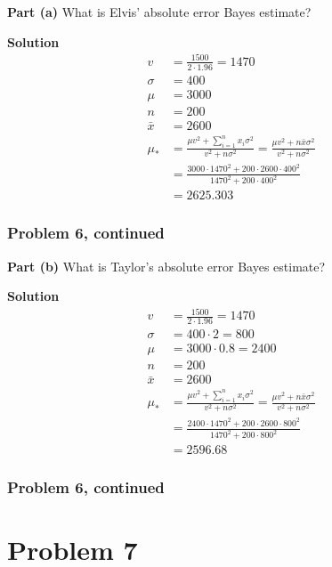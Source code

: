 \documentclass[12pt]{article}
\theoremstyle{definition}
\begin{document}
\bigskip
\noindent
{\bf Part (a)} What is Elvis' absolute error Bayes estimate?


\bigskip
\noindent
{\bf Solution}
\begin{align*}
v &=  \frac{1500}{2\cdot 1.96} = 1470\\
\sigma &= 400\\
\mu &= 3000\\
n &= 200\\
\bar{x} &= 2600\\
\mu_{*} &= \frac{\mu v^2 + \sum_{i=1}^n x_i \sigma^2}{v^2 + n\sigma^2} = \frac{\mu v^2 + n \bar{x}\sigma^2}{v^2 + n\sigma^2}\\
&= \frac{3000 \cdot 1470^2 + 200 \cdot 2600 \cdot 400^2}{1470^2 + 200 \cdot 400^2}\\
&= 2625.303
\end{align*}

\newpage
\subsubsection*{Problem 6, continued}

\vspace{3.5in}
\noindent
{\bf Part (b)} What is Taylor's absolute error Bayes estimate?

\bigskip
\noindent
{\bf Solution}
\begin{align*}
v &=  \frac{1500}{2\cdot 1.96} = 1470\\
\sigma &= 400 \cdot 2 = 800\\
\mu &= 3000 \cdot 0.8 = 2400\\
n &= 200\\
\bar{x} &= 2600\\
\mu_{*} &= \frac{\mu v^2 + \sum_{i=1}^n x_i \sigma^2}{v^2 + n\sigma^2} = \frac{\mu v^2 + n \bar{x}\sigma^2}{v^2 + n\sigma^2}\\
&= \frac{2400 \cdot 1470^2 + 200 \cdot 2600 \cdot 800^2}{1470^2 + 200 \cdot 800^2}\\
&= 2596.68
\end{align*}
\newpage
\subsubsection*{Problem 6, continued}




\newpage
\section*{Problem 7}
\end{document}
